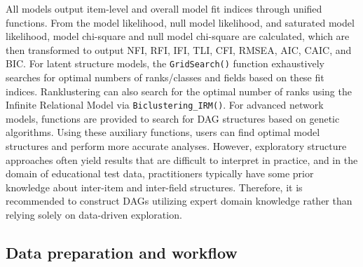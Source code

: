 \begin{table}[!h]
\centering
\caption{\label{tab:table2}Structure Exploration Tools}
\centering
{}
\end{table}

All models output item-level and overall model fit indices through unified functions. From the model likelihood, null model likelihood, and saturated model likelihood, model chi-square and null model chi-square are calculated, which are then transformed to output NFI, RFI, IFI, TLI, CFI, RMSEA, AIC, CAIC, and BIC. For latent structure models, the \texttt{GridSearch()} function exhaustively searches for optimal numbers of ranks/classes and fields based on these fit indices. Ranklustering can also search for the optimal number of ranks using the Infinite Relational Model via \texttt{Biclustering\_IRM()}. For advanced network models, functions are provided to search for DAG structures based on genetic algorithms. Using these auxiliary functions, users can find optimal model structures and perform more accurate analyses. However, exploratory structure approaches often yield results that are difficult to interpret in practice, and in the domain of educational test data, practitioners typically have some prior knowledge about inter-item and inter-field structures. Therefore, it is recommended to construct DAGs utilizing expert domain knowledge rather than relying solely on data-driven exploration.

\subsection{Data preparation and workflow}\label{data-preparation-and-workflow}

